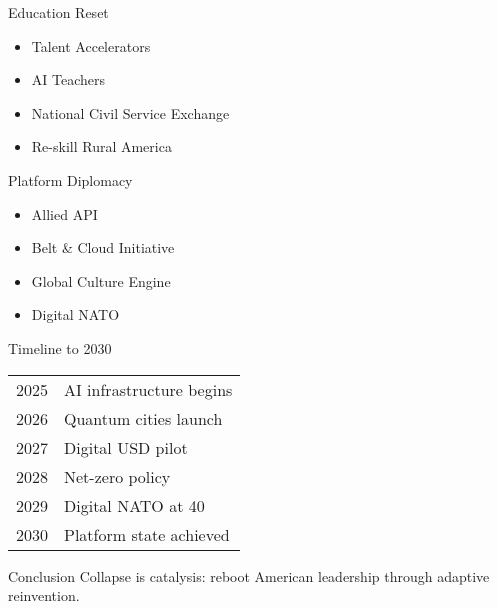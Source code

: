 \documentclass{beamer}
\begin{document}
\begin{frame}{Education Reset}
\begin{itemize}
    \item Talent Accelerators
    \item AI Teachers
    \item National Civil Service Exchange
    \item Re-skill Rural America
\end{itemize}
\end{frame}

\begin{frame}{Platform Diplomacy}
\begin{itemize}
    \item Allied API
    \item Belt \& Cloud Initiative
    \item Global Culture Engine
    \item Digital NATO
\end{itemize}
\end{frame}

\begin{frame}{Timeline to 2030}
\begin{tabular}{ll}
2025 & AI infrastructure begins \\
2026 & Quantum cities launch \\
2027 & Digital USD pilot \\
2028 & Net-zero policy \\
2029 & Digital NATO at 40 \\
2030 & Platform state achieved \\
\end{tabular}
\end{frame}

\begin{frame}{Conclusion}
Collapse is catalysis: reboot American leadership through adaptive reinvention.
\end{frame}
\end{document}
